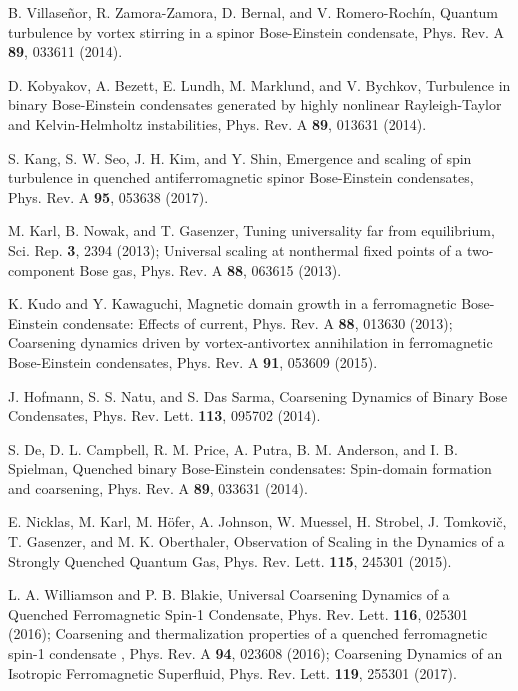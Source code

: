 \documentclass[12pt,a4paper]{jbook}
\begin{document}
\begin{thebibliography}{99}
        B. Villase\~nor, R. Zamora-Zamora, D. Bernal, and V. Romero-Roch\'in,
        Quantum turbulence by vortex stirring in a spinor Bose-Einstein condensate,
        Phys. Rev. A \textbf{89}, 033611 (2014).

        D. Kobyakov, A. Bezett, E. Lundh, M. Marklund, and V. Bychkov,
        Turbulence in binary Bose-Einstein condensates generated
        by highly nonlinear Rayleigh-Taylor and Kelvin-Helmholtz instabilities,
        Phys. Rev. A \textbf{89}, 013631 (2014).
        
        S. Kang, S. W. Seo, J. H. Kim, and Y. Shin,
        Emergence and scaling of spin turbulence in quenched antiferromagnetic
        spinor Bose-Einstein condensates,
        Phys. Rev. A \textbf{95}, 053638 (2017).
        
        M. Karl, B. Nowak, and T. Gasenzer,
        Tuning universality far from equilibrium,
        Sci. Rep. \textbf{3}, 2394 (2013);
        Universal scaling at nonthermal fixed points of a two-component Bose gas,
        Phys. Rev. A \textbf{88}, 063615 (2013).
        
        K. Kudo and Y. Kawaguchi,
        Magnetic domain growth in a ferromagnetic Bose-Einstein condensate: Effects
        of current,
        Phys. Rev. A \textbf{88}, 013630 (2013);
        Coarsening dynamics driven by vortex-antivortex annihilation in
        ferromagnetic Bose-Einstein condensates,
        Phys. Rev. A \textbf{91}, 053609 (2015).
        
        J. Hofmann, S. S. Natu, and S. Das Sarma,
        Coarsening Dynamics of Binary Bose Condensates,
        Phys. Rev. Lett. \textbf{113}, 095702 (2014).

        S. De, D. L. Campbell, R. M. Price, A. Putra, B. M. Anderson, and
        I. B. Spielman,
        Quenched binary Bose-Einstein condensates: Spin-domain formation and
        coarsening,
        Phys. Rev. A \textbf{89}, 033631 (2014).
        
        E. Nicklas, M. Karl, M. H\"ofer, A. Johnson, W. Muessel, H. Strobel,
        J. Tomkovi\v{c}, T. Gasenzer, and M. K. Oberthaler,
        Observation of Scaling in the Dynamics of a Strongly Quenched Quantum Gas,
        Phys. Rev. Lett. \textbf{115}, 245301 (2015).

        L. A. Williamson and P. B. Blakie,
        Universal Coarsening Dynamics of a Quenched Ferromagnetic Spin-1 Condensate,
        Phys. Rev. Lett. \textbf{116}, 025301 (2016);
        Coarsening and thermalization properties of a quenched ferromagnetic spin-1
        condensate ,
        Phys. Rev. A \textbf{94}, 023608 (2016);
        Coarsening Dynamics of an Isotropic Ferromagnetic Superfluid,
        Phys. Rev. Lett. \textbf{119}, 255301 (2017).


\end{thebibliography}
\end{document}

